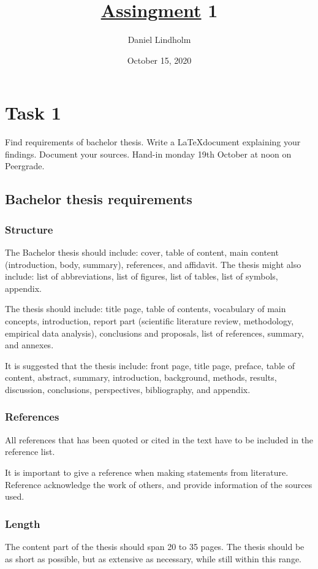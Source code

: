 \documentclass[a4paper]{article}
\title{\href{https://datsoftlyngby.github.io/soft2020fall/resources/8af56d7d-assignment-01.pdf}{Assingment} 1}
\author{Daniel Lindholm}
\date{October 15, 2020}
\begin{document}
\maketitle
\tableofcontents

\section{Task 1}
Find requirements of bachelor thesis. Write a \LaTeX document explaining your
findings. Document your sources. Hand-in monday 19th October at noon on
Peergrade.

\subsection{Bachelor thesis requirements}

\subsubsection{Structure}
The Bachelor thesis should include: cover, table of content, main content (introduction, body, summary), references, and affidavit. The thesis might also include: list of abbreviations, list of figures, list of tables, list of symbols, appendix.\cite{unimannheim2014guidelines}

\noindent The thesis should include: title page, table of contents, vocabulary of main concepts, introduction, report part (scientific literature review, methodology, empirical data analysis), conclusions and proposals, list of references, summary, and annexes.\cite{mru2018requirements}

\noindent It is suggested that the thesis include: front page, title page, preface, table of content, abstract, summary, introduction, background, methods, results, discussion, conclusions, perspectives, bibliography, and appendix.\cite{au2020guidelines}

\subsubsection{References}
All references that has been quoted or cited in the text have to be included in the reference list.\cite{unimannheim2014guidelines}

\noindent It is important to give a reference when making statements from literature. Reference acknowledge the work of others, and provide information of the sources used.\cite{au2020guidelines}

\subsubsection{Length}
The content part of the thesis should span 20 to 35 pages. The thesis should be as short as possible, but as extensive as necessary, while still within this range.\cite{unimannheim2014guidelines}
\end{document}

